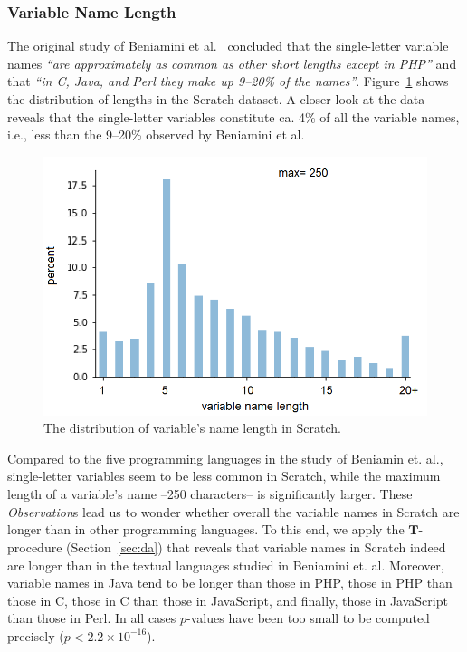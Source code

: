 \documentclass[conference]{IEEEtran}
\begin{document}
\subsubsection{Variable Name Length}
\label{res:var:length}
The original study of Beniamini et al.~\cite{Beniamini} concluded that the single-letter variable names \emph{``are approximately as common as other short lengths except in PHP''} and that \emph{``in C, Java, and Perl they make up 9--20\% of the names''}. 
Figure~\ref{fig:distribution_of_lengths} shows the distribution of lengths in the Scratch dataset. A closer look at the data reveals that the single-letter variables constitute ca. 4\% of all the variable names, i.e., less than the 9--20\% observed by Beniamini et al.
\begin{figure}[tb]
	\begin{center}
		\includegraphics[scale=.3]{fig/project/distribution_var_name_length}
		\caption{The distribution of variable's name length in Scratch.}
		\label{fig:distribution_of_lengths}
	\end{center}
\end{figure} 
Compared to the five programming languages in the study of Beniamin et. al., single-letter variables seem to be less common in Scratch, while the maximum length of a variable's name --250 characters-- is significantly larger. 
These \emph{Observation}s lead us to wonder whether overall the variable names in Scratch are longer than in other programming languages.
To this end, we apply the $\widetilde{\mathbf{T}}$-procedure (Section~\ref{sec:da}) that reveals that variable names in Scratch indeed are longer than in the textual languages studied in Beniamini et. al.
Moreover, variable names in Java tend to be longer than those in PHP, those in PHP than those in C, those in C than those in JavaScript, and finally, those in JavaScript than those in Perl. In all cases $p$-values have been too small to be computed precisely ($p < 2.2\times 10^{-16}$).
\end{document}
